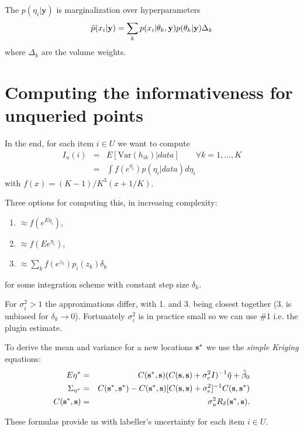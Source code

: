 \documentclass[10pt, onecolumn]{article}
\newcommand{\y}{\mathbf{y}}
\begin{document}
The $p(\eta_i|\y)$ is marginalization over hyperparameters
\begin{eqnarray}
\tilde p(x_i|\y) = \sum_k p(x_i|\bold\theta_k, \y) p(\bold\theta_k | \y) \Delta_k
\end{eqnarray}
where $\Delta_k$ are the volume weights.



\section*{Computing the informativeness for unqueried points}

In the end, for each item $i\in U$ we want to compute 
\begin{eqnarray}
I_u(i) &=& E[\mathrm{Var }(h_{ik}) | data]\qquad \forall k=1,...,K\\
&=& \int f(e^{\eta_i}) p(\eta_i | data) d\eta_i
\end{eqnarray}
with $f(x)=(K-1)/K^3(x+1/K)$.

Three options for computing this, in increasing complexity:
\begin{enumerate}
\item $\approx f(e^{E \eta_i})$,
\item $\approx f(E e^{\eta_i})$,
\item $\approx \sum_k f(e^{z_{k}})p_i(z_k) \delta_k$
\end{enumerate}
for some integration scheme with constant step size $\delta_k$. 

For $\sigma_i^2>1$ the approximations differ, with 1. and 3. being closest together (3. is unbiased for $\delta_k \rightarrow 0$). Fortunately $\sigma_i^2$ is in practice small so we can use \#1 i.e. the plugin estimate.

To derive the mean and variance for a new locations $\bold s^*$ we use the \textit{simple Kriging} equations:
\begin{eqnarray}
E\eta^*  &=&  C(\bold s^*, \bold s)(C(\bold s, \bold s)+\sigma_e^2 I)^{-1} \hat \eta + \hat \beta_0\\
\Sigma_{\eta^*} &=& C(\bold s^*, \bold s^*) - C(\bold s^*, \bold s)[C(\bold s, \bold s) + \sigma_e^2]^{-1} C(\bold s,\bold s^*)\\
C(\bold s^*, \bold s) &=& \sigma_u^2 R_\delta(\bold s^*,\bold s).
\end{eqnarray}

These formulas provide us with labeller's uncertainty for each item $i\in U$.
\end{document}
